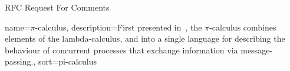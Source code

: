
\makeatletter
\newcommand*{\glsplainhyperlink}[2]{%
  \begingroup%
  \ifglshaslong{\glslabel}%
  {\hyperlink{#1}{#2}}%
  {%
    \hypersetup{hidelinks}%
    \hyperlink{#1}{#2}%
  }%
  \endgroup%
}
\let\@glslink\glsplainhyperlink
\makeatother


\makeglossaries




\renewcommand*{\glsxtruserparen}[2]{%
  \glsxtrfullsep{#2}%
  (\glshyperlink[#1]{#2})%
}

\renewcommand*{\glslinkcheckfirsthyperhook}{%
  \ifglsused{\glslabel}%
  {%
    \ifglshaslong{\glslabel}%
    {\setkeys{glslink}{hyper=true,textformat=normalfont}}%
    {\setkeys{glslink}{hyper=true,textformat=normalfont}}%
  }{%
    \ifglshaslong{\glslabel}%
    {\setkeys{glslink}{hyper=false,textformat=normalfont}}%
    {\setkeys{glslink}{hyper=true,textformat=normalfont}}%
  }%
}




{RFC}
{{R}equest {F}or {C}omments}



{
  name={${\pi}$-calculus},
  description={First presented in~\textcite{Milner1999}, the $\pi$-calculus combines elements of the \gls{lambda-calculus},  and  into a single language for describing the behaviour of concurrent processes that exchange information via message-passing.},
  sort={pi-calculus}
}


